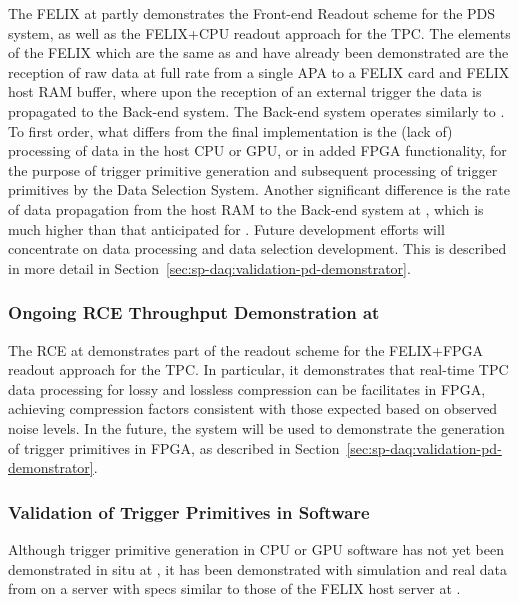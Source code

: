 The FELIX  at  partly demonstrates the Front-end Readout scheme for
the PDS system, as well as the FELIX+CPU readout approach for the
TPC. The elements of the  FELIX  which are the
same as  and have already been demonstrated are the
reception of raw data at full rate from a single APA to a 
FELIX card and FELIX host RAM buffer, where upon the reception of an external trigger the
data is propagated to the Back-end system. The Back-end system
operates similarly to . To first order, what differs from the final 
implementation is the (lack of) processing of data in the host CPU or
GPU, or in added FPGA functionality, for
the purpose of trigger primitive generation and subsequent processing
of trigger primitives by the Data Selection System. Another
significant difference is the rate of data propagation from the
host RAM to the Back-end system at , which is much higher
than that anticipated for . Future development
efforts will concentrate on data processing and data selection
development.  This is described in more detail in Section~\ref{sec:sp-daq:validation-pd-demonstrator}.

\subsubsection{Ongoing RCE Throughput Demonstration at }
\label{sec:sp-daq:validation-pdune-rce}

The RCE  at  demonstrates part of the readout scheme for
the FELIX+FPGA readout approach for the TPC. In particular, it
demonstrates that real-time TPC data processing for lossy
and lossless compression can be facilitates in FPGA, achieving
compression factors consistent with those expected based on observed
 noise levels. In the future, the system will be used
to demonstrate the generation of trigger primitives in FPGA, as
described in Section~\ref{sec:sp-daq:validation-pd-demonstrator}.

\subsubsection{Validation of Trigger Primitives in Software}
\label{sec:sp-daq:validation-software-trigger-primitives}

Although trigger primitive generation in CPU or GPU software has not
yet been demonstrated in situ at , it has been
demonstrated with simulation and real data from  on a
server with specs similar to those 
of the FELIX host server at .

